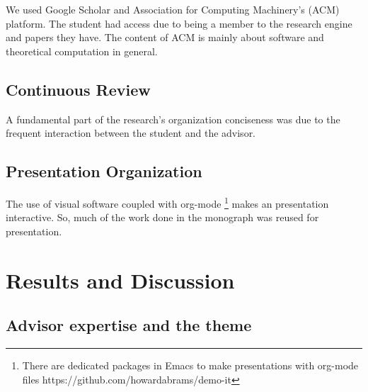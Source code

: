 \documentclass[
12pt,				%
openright,			%
oneside,			%
a4paper,			%
brazil,				%
english,			%
]{abntex2}
\begin{document}
We used Google Scholar and Association for Computing Machinery's (ACM)
platform. The student had access due to being a member to the research
engine and papers they have. The content of ACM is mainly about
software and theoretical computation in general. 

\section{Continuous Review}
A fundamental part of the research's organization conciseness was due
to the frequent interaction between the student and the advisor.

\section{Presentation Organization}
The use of visual software coupled with org-mode \footnote{There are
  dedicated packages in Emacs to make presentations with org-mode
  files https://github.com/howardabrams/demo-it} makes an presentation
interactive. So, much of the work done in the monograph was reused for presentation.

\chapter{Results and Discussion}

\section{Advisor expertise and the theme}
\end{document}

